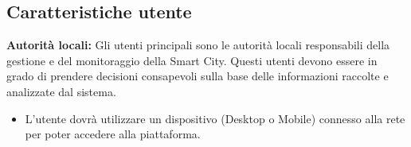 \subsection{Caratteristiche utente}
\textbf{Autorità locali:} Gli utenti principali sono le autorità locali responsabili della gestione e del monitoraggio della Smart City. Questi utenti devono essere in grado di prendere decisioni consapevoli sulla base delle informazioni raccolte e analizzate dal sistema.
\begin{itemize}
    \item L'utente dovrà utilizzare un dispositivo (Desktop o Mobile) connesso alla rete per poter accedere alla piattaforma.
\end{itemize}
